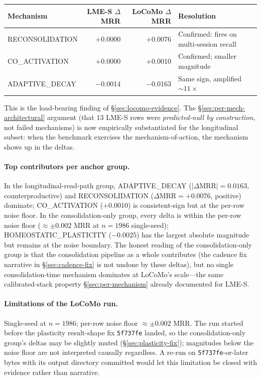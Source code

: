 \documentclass[11pt]{article}
\begin{document}
\begin{center}
\small
\begin{tabular}{lrrl}
\toprule
Mechanism        & LME-S $\Delta$MRR & LoCoMo $\Delta$MRR & Resolution \\
\midrule
RECONSOLIDATION  & $+$0.0000 & $+$0.0076 & Confirmed: fires on multi-session recall \\
CO\_ACTIVATION   & $+$0.0000 & $+$0.0010 & Confirmed; smaller magnitude \\
ADAPTIVE\_DECAY  & $-$0.0014 & $-$0.0163 & Same sign, amplified $\sim 11\times$ \\
\bottomrule
\end{tabular}
\end{center}

This is the load-bearing finding of \S\ref{sec:locomo-evidence}.  The
\S\ref{sec:per-mech-architectural} argument (that 13 LME-S rows were
\emph{predicted-null by construction}, not failed mechanisms) is now
empirically substantiated for the longitudinal subset: when the
benchmark exercises the mechanism-of-action, the mechanism shows up
in the deltas.

\paragraph{Top contributors per anchor group.}  In the
longitudinal-read-path group, ADAPTIVE\_DECAY ($|\Delta\text{MRR}| =
0.0163$, counterproductive) and RECONSOLIDATION ($\Delta\text{MRR} =
+0.0076$, positive) dominate; CO\_ACTIVATION ($+0.0010$) is
consistent-sign but at the per-row noise floor.  In the
consolidation-only group, every delta is within the per-row noise
floor ($\approx \pm 0.002$ MRR at $n = 1986$ single-seed);
HOMEOSTATIC\_PLASTICITY ($-0.0025$) has the largest absolute
magnitude but remains at the noise boundary.  The
honest reading of the consolidation-only group is that
the consolidation pipeline as a whole contributes (the cadence fix
narrative in \S\ref{sec:cadence-fix} is not undone by these deltas),
but no single consolidation-time mechanism dominates at LoCoMo's
scale---the same calibrated-stack property
\S\ref{sec:per-mechanism} already documented for LME-S.

\paragraph{Limitations of the LoCoMo run.}  Single-seed at
$n = 1986$; per-row noise floor $\approx \pm 0.002$ MRR.  The run
started before the plasticity result-shape fix \texttt{5f737fe}
landed, so the consolidation-only group's deltas may be slightly
muted (\S\ref{sec:plasticity-fix}); magnitudes below the noise floor
are not interpreted causally regardless.  A re-run on
\texttt{5f737fe}-or-later bytes with its output directory committed
would let this limitation be closed with evidence rather than
narrative.
\end{document}
